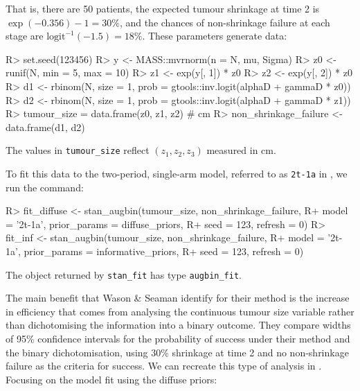\documentclass[article]{jss}
\begin{document}
That is, there are 50 patients, the expected tumour shrinkage at time 2
is \(\exp(-0.356) - 1 = 30\%\), and the chances of non-shrinkage failure
at each stage are \(\text{logit}^{-1}(-1.5) = 18\%\). These parameters
generate data:

\begin{CodeChunk}

\begin{CodeInput}
R> set.seed(123456)
R> y <- MASS::mvrnorm(n = N, mu, Sigma)
R> z0 <- runif(N, min = 5, max = 10)
R> z1 <- exp(y[, 1]) * z0
R> z2 <- exp(y[, 2]) * z0
R> d1 <- rbinom(N, size = 1, prob = gtools::inv.logit(alphaD + gammaD * z0))
R> d2 <- rbinom(N, size = 1, prob = gtools::inv.logit(alphaD + gammaD * z1))
R> tumour_size = data.frame(z0, z1, z2) # cm
R> non_shrinkage_failure <- data.frame(d1, d2)
\end{CodeInput}
\end{CodeChunk}

The values in \texttt{tumour\_size} reflect \((z_1, z_2, z_3)\) measured
in cm.

To fit this data to the two-period, single-arm model, referred to as
\texttt{2t-1a} in , we run the command:

\begin{CodeChunk}

\begin{CodeInput}
R> fit_diffuse <- stan_augbin(tumour_size, non_shrinkage_failure, 
R+                            model = '2t-1a', prior_params = diffuse_priors, 
R+                            seed = 123, refresh = 0)
R> fit_inf <- stan_augbin(tumour_size, non_shrinkage_failure, 
R+                        model = '2t-1a', prior_params = informative_priors, 
R+                        seed = 123, refresh = 0)
\end{CodeInput}
\end{CodeChunk}

The object returned by \texttt{stan\_fit} has type \texttt{augbin\_fit}.

The main benefit that Wason \& Seaman identify for their method is the
increase in efficiency that comes from analysing the continuous tumour
size variable rather than dichotomising the information into a binary
outcome. They compare widths of 95\% confidence intervals for the
probability of success under their method and the binary
dichotomisation, using 30\% shrinkage at time 2 and no non-shrinkage
failure as the criteria for success. We can recreate this type of
analysis in . Focusing on the model fit using the diffuse
priors:
\end{document}
